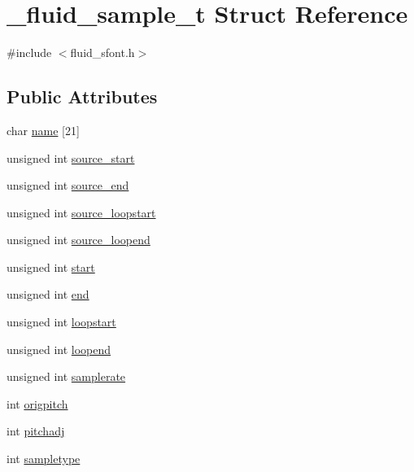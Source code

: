 \hypertarget{struct__fluid__sample__t}{}\section{\+\_\+fluid\+\_\+sample\+\_\+t Struct Reference}
\label{struct__fluid__sample__t}


{\ttfamily \#include $<$fluid\+\_\+sfont.\+h$>$}

\subsection*{Public Attributes}
\begin{DoxyCompactItemize}
\item 
char \hyperlink{struct__fluid__sample__t_a054c9821ce07e9c680331bfc29cf7a1f}{name} \mbox{[}21\mbox{]}
\item 
unsigned int \hyperlink{struct__fluid__sample__t_aa02d79a03cb990b9f99c6a9161eb1ac6}{source\+\_\+start}
\item 
unsigned int \hyperlink{struct__fluid__sample__t_a9658c79a9458399c4e6c44227d35763f}{source\+\_\+end}
\item 
unsigned int \hyperlink{struct__fluid__sample__t_abcd86e0655e80a45f577c9758917c3c3}{source\+\_\+loopstart}
\item 
unsigned int \hyperlink{struct__fluid__sample__t_ac51da14264b3fea19b77ce1ea3b217ab}{source\+\_\+loopend}
\item 
unsigned int \hyperlink{struct__fluid__sample__t_a239a49135dad3eedf6ea9ada921f9583}{start}
\item 
unsigned int \hyperlink{struct__fluid__sample__t_a955d338a740c562bd9b298d87b165b0c}{end}
\item 
unsigned int \hyperlink{struct__fluid__sample__t_a708e728c1dd67bb62a70e4edd7fc1f1c}{loopstart}
\item 
unsigned int \hyperlink{struct__fluid__sample__t_a3baa4ca199a55b77c2692d9d3211e0d0}{loopend}
\item 
unsigned int \hyperlink{struct__fluid__sample__t_a323da7b5b6db34a67cb59a4b4b0e3e9a}{samplerate}
\item 
int \hyperlink{struct__fluid__sample__t_a1a2bb5f13ed47a3e59b650f9f0cf4bf9}{origpitch}
\item 
int \hyperlink{struct__fluid__sample__t_a12b4133d7631a3043d008fdaa78eb5dc}{pitchadj}
\item 
int \hyperlink{struct__fluid__sample__t_a081352a55ed01814a219875eee20628b}{sampletype}

\end{DoxyCompactItemize}
